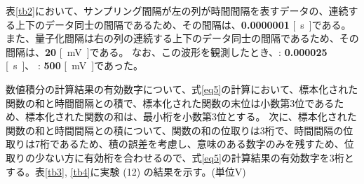 \begin{enumerate}
  表\ref{tb2}において、サンプリング間隔が左の列が時間間隔を表すデータの、連続する上下のデータ同士の間隔であるため、その間隔は、\textbf{0.0000001} \si{[s]}である。
また、量子化間隔は右の列の連続する上下のデータ同士の間隔であるため、その間隔は、\textbf{20} \si{[mV]}である。
なお、この波形を観測したとき、\textbf{}: \textbf{0.000025} \si{[s]}、 \textbf{}: \textbf{500} \si{[mV]}であった。
\end{enumerate}


  数値積分の計算結果の有効数字について、式\eqref{eq5}の計算において、標本化された関数の和と時間間隔との積で、標本化された関数の末位は小数第3位であるため、標本化された関数の和は、最小桁を小数第3位とする。
  次に、標本化された関数の和と時間間隔との積について、関数の和の位取りは3桁で、時間間隔の位取りは7桁であるため、積の誤差を考慮し、意味のある数字のみを残すため、位取りの少ない方に有効桁を合わせるので、式\eqref{eq5}の計算結果の有効数字を3桁とする。表\ref{tb3}, \ref{tb4}に実験 (12) の結果を示す。(単位\si{V})
  
